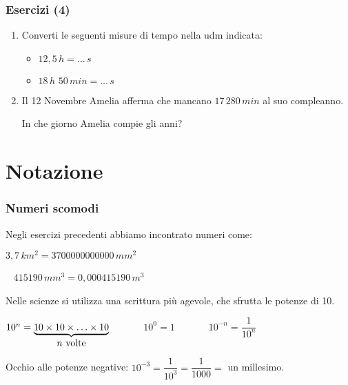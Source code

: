 \documentclass[]{beamer}
\begin{document}
\begin{frame}
\frametitle{Esercizi (4)}
\begin{enumerate}
  \item Converti le seguenti misure di tempo nella udm indicata:
  \begin{multicols}{2}
    \begin{itemize}
        \item $ 12,5 \, h = \ldots \, s $
        \item $ 18 \, h \,\, 50 \, min = \ldots \, s $
    \end{itemize}
  \end{multicols}
  \item Il 12 Novembre Amelia afferma che mancano $ 17 \, 280 \, min $ al suo compleanno.
  
  In che giorno Amelia compie gli anni?
\end{enumerate}
\end{frame}


\section{Notazione}

\begin{frame}
\frametitle{Numeri scomodi}
Negli esercizi precedenti abbiamo incontrato numeri come:
\begin{center}
$ 3,7 \, km^2 = 3700000000000 \, mm^2 $

~
$ 415190 \, mm^3 = 0,000415190 \, m^3$
\end{center}\pause
Nelle scienze si utilizza una scrittura più agevole, che sfrutta le \alert<2->{potenze di 10}.

\begin{center}
\colorbox{blue!30}{$10^n = \underbrace{\hbox{$10 \times 10 \times \ldots \times 10$}}_{\hbox{$ n $ volte}}$}\pause~~~~~~~\colorbox{blue!30}{$10^0 = 1$}\pause~~~~~~~\colorbox{blue!30}{$10^{-n} = \dfrac{1}{10^n}$}
\end{center}
Occhio alle potenze negative: $ 10^{-3} = \dfrac{1}{10^3} = \dfrac{1}{1000} = $ un millesimo.
\end{frame}
\end{document}
